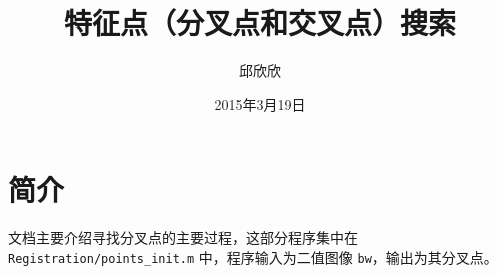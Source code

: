 \documentclass[12pt]{article}
\begin{document}
\title{\vspace{-2em}特征点（分叉点和交叉点）搜索\vspace{-0.7em}}

\author{邱欣欣}
\date{\vspace{-0.7em}2015年3月19日\vspace{-0.7em}}
\maketitle\thispagestyle{fancy}

\section{简介}
文档主要介绍寻找分叉点的主要过程，这部分程序集中在 \verb|Registration/points_init.m| 中，程序输入为二值图像 \verb|bw|，输出为其分叉点。
\end{document}
